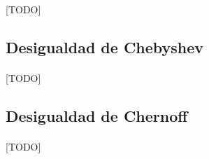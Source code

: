 \documentclass{subfiles}
\begin{document}
        \paragraph{}
        [TODO]

      \subsection{Desigualdad de Chebyshev}
      \label{sec:streaming_chebyshev}

        \paragraph{}
        [TODO]

      \subsection{Desigualdad de Chernoff}
      \label{sec:streaming_chernoff}

        \paragraph{}
        [TODO]
\end{document}
